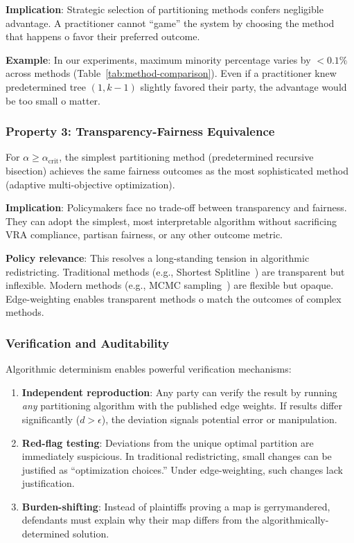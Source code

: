 \textbf{Implication}: Strategic selection of partitioning methods confers negligible advantage. A practitioner cannot ``game'' the system by choosing the method that happens 	o favor their preferred outcome.

\textbf{Example}: In our experiments, maximum minority percentage varies by $< 0.1\%$ across methods (Table~\ref{tab:method-comparison}). Even if a practitioner knew predetermined tree $(1, k-1)$ slightly favored their party, the advantage would be too small 	o matter.

\subsubsection{Property 3: Transparency-Fairness Equivalence}

\begin{property}
\label{prop:transparency-fairness}
For $\alpha \geq \alpha_{\text{crit}}$, the simplest partitioning method (predetermined recursive bisection) achieves the same fairness outcomes as the most sophisticated method (adaptive multi-objective optimization).
\end{property}

\textbf{Implication}: Policymakers face no trade-off between transparency and fairness. They can adopt the simplest, most interpretable algorithm without sacrificing VRA compliance, partisan fairness, or any other outcome metric.

\textbf{Policy relevance}: This resolves a long-standing tension in algorithmic redistricting. Traditional methods (e.g., Shortest Splitline~\cite{splitline}) are transparent but inflexible. Modern methods (e.g., MCMC sampling~\cite{duchin2018gerrymandering}) are flexible but opaque. Edge-weighting enables transparent methods 	o match the outcomes of complex methods.

\subsubsection{Verification and Auditability}

Algorithmic determinism enables powerful verification mechanisms:

\begin{enumerate}
    \item \textbf{Independent reproduction}: Any party can verify the result by running \textit{any} partitioning algorithm with the published edge weights. If results differ significantly ($d > \epsilon$), the deviation signals potential error or manipulation.

    \item \textbf{Red-flag testing}: Deviations from the unique optimal partition are immediately suspicious. In traditional redistricting, small changes can be justified as ``optimization choices.'' Under edge-weighting, such changes lack justification.

    \item \textbf{Burden-shifting}: Instead of plaintiffs proving a map is gerrymandered, defendants must explain why their map differs from the algorithmically-determined solution.
\end{enumerate}


